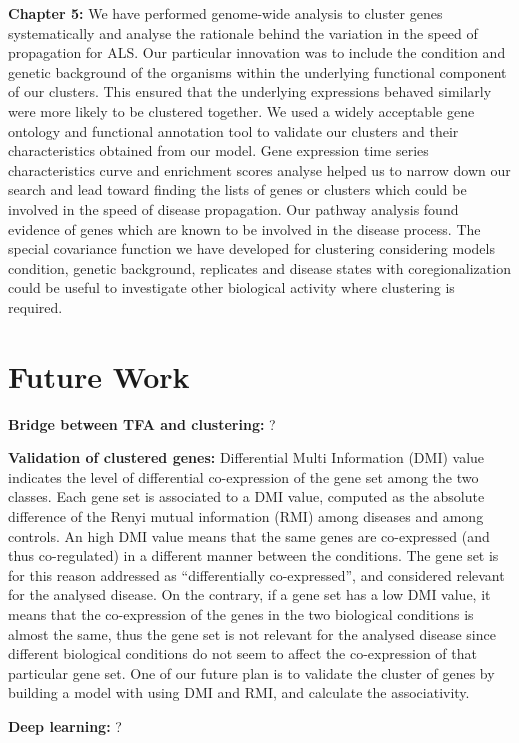 \textbf{Chapter 5:} We have performed genome-wide analysis to cluster genes systematically and analyse the rationale behind the variation in the speed of propagation for ALS. Our particular innovation was to include the condition and genetic background of the organisms within the underlying functional component of our clusters. This ensured that the underlying expressions behaved similarly were more likely to be clustered together. We used a widely acceptable gene ontology and functional annotation tool to validate our clusters and their characteristics obtained from our model. Gene expression time series characteristics curve and enrichment scores analyse helped us to narrow down our search and lead toward finding the lists of genes or clusters which could be involved in the speed of disease propagation. Our pathway analysis found evidence of genes which are known to be involved in the disease process. The special covariance function we have developed for clustering considering models condition, genetic background, replicates and disease states with coregionalization could be useful to investigate other biological activity where clustering is required. 

\section{Future Work}
\textbf{Bridge between TFA and clustering:} ?


\textbf{Validation of clustered genes:} Differential Multi Information (DMI) value indicates the level of differential co-expression of the gene set among the two classes. Each gene set is associated to a DMI value, computed as the absolute difference of the Renyi mutual information (RMI) among diseases and among controls. An high DMI value means that the same genes are co-expressed (and thus co-regulated) in a different manner between the conditions. The gene set is for this reason addressed as “differentially co-expressed”, and considered relevant for the analysed disease. On the contrary, if a gene set has a low DMI value, it means that the co-expression of the genes in the two biological conditions is almost the same, thus the gene set is not relevant for the analysed disease since different biological conditions do not seem to affect the co-expression of that particular gene set. One of our future plan is to validate the cluster of genes by building a model with using DMI and RMI, and calculate the associativity.

\textbf{Deep learning:} ?



